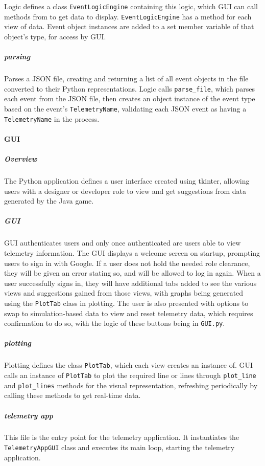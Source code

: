 Logic defines a class \texttt{EventLogicEngine} containing this logic, which GUI can call methods from to get data to display. \texttt{EventLogicEngine} has a method for each view of data. Event object instances are added to a set member variable of that object's type, for access by GUI.

\subparagraph{parsing}
Parses a JSON file, creating and returning a list of all event objects in the file converted to their Python representations. Logic calls \texttt{parse\_file}, which parses each event from the JSON file, then creates an object instance of the event type based on the event's \texttt{TelemetryName}, validating each JSON event as having a \texttt{TelemetryName} in the process.

\paragraph{GUI}

\subparagraph{Overview}
The Python application defines a user interface created using tkinter, allowing users with a designer or developer role to view and get suggestions from data generated by the Java game.

\subparagraph{GUI}
GUI authenticates users and only once authenticated are users able to view telemetry information. The GUI displays a welcome screen on startup, prompting users to sign in with Google. If a user does not hold the needed role clearance, they will be given an error stating so, and will be allowed to log in again. When a user successfully signs in, they will have additional tabs added to see the various views and suggestions gained from those views, with graphs being generated using the \texttt{PlotTab} class in plotting. The user is also presented with options to swap to simulation-based data to view and reset telemetry data, which requires confirmation to do so, with the logic of these buttons being in \texttt{GUI.py}.

\subparagraph{plotting}
Plotting defines the class \texttt{PlotTab}, which each view creates an instance of. GUI calls an instance of \texttt{PlotTab} to plot the required line or lines through \texttt{plot\_line} and \texttt{plot\_lines} methods for the visual representation, refreshing periodically by calling these methods to get real-time data.

\subparagraph{telemetry app}
This file is the entry point for the telemetry application. It instantiates the \texttt{TelemetryAppGUI} class and executes its main loop, starting the telemetry application.

